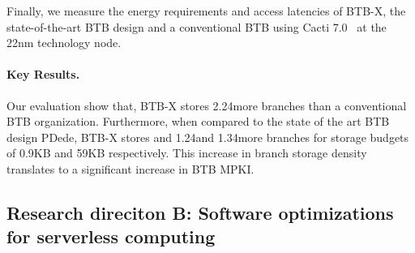 \documentclass[../main.tex]{subfiles}
\begin{document}
\begin{refsection}
Finally, we measure the energy requirements and access latencies of
BTB-X, the state-of-the-art BTB design and a conventional BTB using Cacti 7.0~\cite{cacti} at the 22nm technology node.

\paragraph{Key Results.}

Our evaluation show that, BTB-X stores 2.24\texttimes more branches
than a conventional BTB organization. Furthermore, when compared to
the state of the art BTB design PDede, BTB-X stores  and
1.24\texttimes and 1.34\texttimes more branches for storage budgets of
0.9KB and 59KB respectively. This increase in branch storage density
translates to a significant increase in BTB MPKI. 


\subsection{Research direciton B: Software optimizations for serverless computing}


\end{refsection}
\end{document}
